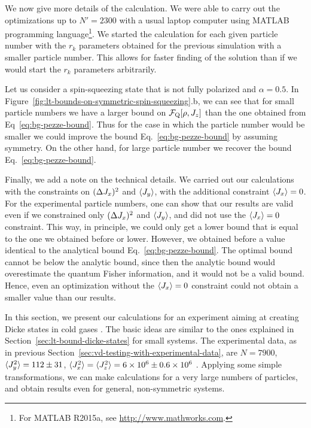 We now give more details of the calculation. We were able to carry out the optimizations up to $N'=2300$ with a usual laptop computer using MATLAB programming language\footnote{
For MATLAB R2015a, see \url{http://www.mathworks.com}.}.
We started the calculation for each given particle number with the $r_k$ parameters obtained for the previous simulation with a smaller particle number.
This allows for faster finding of the solution than if we would start the $r_k$ parameters arbitrarily.

Let us consider a spin-squeezing state that is not fully polarized and $\alpha=0.5$.
In Figure~\ref{fig:lt-bounds-on-symmetric-spin-squeezing}.b, we can see that for small particle numbers we have a larger bound on $\mathcal{F}_{\textnormal{Q}}[{\textstyle \rho, J_z}]$ than the one obtained from Eq~\eqref{eq:bg-pezze-bound}.
Thus for the case in which the particle number would be smaller we could improve the bound Eq.~\eqref{eq:bg-pezze-bound} by assuming symmetry.
On the other hand, for large particle number we recover the bound Eq.~\eqref{eq:bg-pezze-bound}.

Finally, we add a note on the technical details.
We carried out our calculations with the constraints on $(\Delta J_x )^2$ and $\langle{J_y}\rangle$, with the additional constraint $\langle{J_x}\rangle=0$.
For the experimental particle numbers, one can show that our results are valid even if we constrained only $(\Delta J_x )^2$ and $\langle{J_y}\rangle$, and did not use the $\langle{J_x}\rangle=0$ constraint.
This way, in principle, we could only get a lower bound that is equal to the one we obtained before or lower.
However, we obtained before a value identical to the analytical bound Eq.~\eqref{eq:bg-pezze-bound}.
The optimal bound cannot be below the analytic bound, since then the analytic bound would overestimate the quantum Fisher information, and it would not be a valid bound.
Hence, even an optimization without the $\langle{J_x}\rangle=0$ constraint could not obtain a smaller value than our results.


In this section, we present our calculations for an experiment aiming at creating Dicke states in cold gases \cite{Luecke2014}.
The basic ideas are similar to the ones explained in Section~\ref{sec:lt-bound-dicke-states} for small systems.
The experimental data, as in previous Section~\ref{sec:vd-testing-with-experimental-data}, are $N=7900$, $\langle{J_y^2}\rangle=112\pm31$, $\langle{J_x^2}\rangle=\langle{J_z^2}\rangle=6\times10^6\pm0.6\times10^6$ \cite{Apellaniz2015}.
Applying some simple transformations, we can make calculations for a very large numbers of particles, and obtain results even for general, non-symmetric systems.

